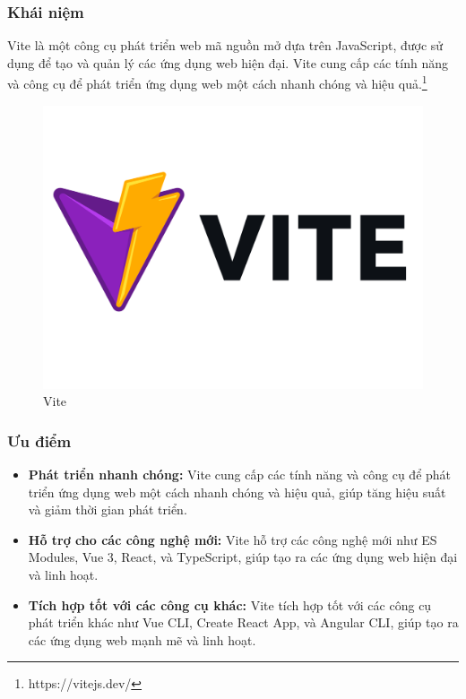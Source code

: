 \subsubsection{Khái niệm}
\noindent Vite là một công cụ phát triển web mã nguồn mở dựa trên JavaScript, được sử dụng để tạo và quản lý các ứng dụng web hiện đại. Vite cung cấp các tính năng và công cụ để phát triển ứng dụng web một cách nhanh chóng và hiệu quả.\footnote{https://vitejs.dev/}
\begin{figure}[H]
  \begin{center}
    \includegraphics[scale=0.35]{images/hieu/phuluc/vite.png}
    \caption{Vite}
  \end{center}
\end{figure}
\subsubsection{Ưu điểm}
\begin{itemize}
  \item \textbf{Phát triển nhanh chóng:} Vite cung cấp các tính năng và công cụ để phát triển ứng dụng web một cách nhanh chóng và hiệu quả, giúp tăng hiệu suất và giảm thời gian phát triển.
  \item \textbf{Hỗ trợ cho các công nghệ mới:} Vite hỗ trợ các công nghệ mới như ES Modules, Vue 3, React, và TypeScript, giúp tạo ra các ứng dụng web hiện đại và linh hoạt.
  \item \textbf{Tích hợp tốt với các công cụ khác:} Vite tích hợp tốt với các công cụ phát triển khác như Vue CLI, Create React App, và Angular CLI, giúp tạo ra các ứng dụng web mạnh mẽ và linh hoạt.
\end{itemize}
